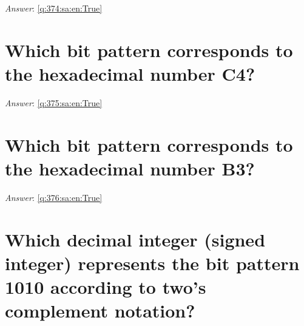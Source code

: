 \documentclass[a4paper,11pt,oneside]{book}
\begin{document}
\begin{sloppypar}
\label{q:374:sa:en:False}

\vspace{2cm}

\noindent\makebox[\textwidth]{\hrulefill}

\vspace{1cm}

\textit{Answer}: \autoref{q:374:sa:en:True}



\section{Which bit pattern corresponds to the hexadecimal number C4?}

\label{q:375:sa:en:False}

\vspace{2cm}

\noindent\makebox[\textwidth]{\hrulefill}

\vspace{1cm}

\textit{Answer}: \autoref{q:375:sa:en:True}



\section{Which bit pattern corresponds to the hexadecimal number B3?}

\label{q:376:sa:en:False}

\vspace{2cm}

\noindent\makebox[\textwidth]{\hrulefill}

\vspace{1cm}

\textit{Answer}: \autoref{q:376:sa:en:True}



\section{Which decimal integer (signed integer) represents the bit pattern 1010 according to two{\textquoteright}s complement notation?}

\label{q:377:sa:en:False}

\vspace{2cm}

\noindent\makebox[\textwidth]{\hrulefill}

\vspace{1cm}


\end{sloppypar}
\end{document}
